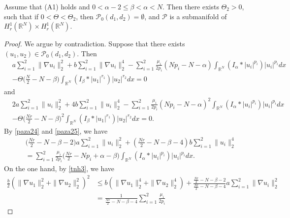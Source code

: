 \documentclass[reqno]{amsart}
\begin{document}
\begin{lemma}\label{zlx}
Assume that {\rm (A1)} holds and $0<\alpha-2\leq\beta<\alpha<N$. Then there exists 
$\Theta_2>0$, such that if $0<\Theta<\Theta_2$, then $\mathcal{P}_0(d_1,d_2)=\emptyset$, 
and $\mathcal{P}$ is a submanifold
of $H_r^1(\mathbb{R}^N)\times H_r^1(\mathbb{R}^N)$.
\end{lemma}

\begin{proof}
We argue by contradiction. Suppose that there exists
 $(u_1,u_2)\in\mathcal{P}_0(d_1,d_2)$. Then
\begin{equation}\label{paza24}
\begin{aligned}
&a\sum_{i=1}^2\| \nabla u_i\|_2^2+b\sum_{i=1}^2\| \nabla u_i\|_2^4
-\sum_{i=1}^2\frac{\mu_i}{2p_i}(Np_i-N-\alpha)
\int_{\mathbb{R}^N}(I_\alpha\ast|u_i|^{p_i})|u_i|^{p_i}dx\\
&-\Theta\Big(\frac{N}{2}-N-\beta\Big)\int_{\mathbb{R}^N}(I_\beta\ast|u_1|^{r_1})|u_2|^{r_2}dx=0
\end{aligned}
\end{equation}
and
\begin{equation}\label{paza25}
\begin{aligned}
&2a\sum_{i=1}^2\| u_i\|_2^2+4b\sum_{i=1}^2\| u_i\|_2^4
-\sum_{i=1}^2\frac{\mu_i}{2p_i}(Np_i-N-\alpha)^2
\int_{\mathbb{R}^N}(I_\alpha\ast|u_i|^{p_i})|u_i|^{p_i}dx\\
&-\Theta\Big(\frac{Nr}{2}-N-\beta\Big)^2\int_{\mathbb{R}^N}
 (I_\beta\ast|u_1|^{r_1})|u_2|^{r_2}dx=0.
\end{aligned}
\end{equation}
By \eqref{paza24} and \eqref{paza25}, we have
\begin{equation}\label{tnh3}
 \begin{aligned}
&\Big(\frac{Nr}{2}-N-\beta-2\Big)a\sum_{i=1}^2\| u_i\|_2^2
+(\frac{Nr}{2}-N-\beta-4)b\sum_{i=1}^2\| u_i\|_2^4\\
&=\sum_{i=1}^2\frac{\mu_i}{2p_i}\Big(\frac{Nr}{2}-Np_i+\alpha-\beta\Big)
\int_{\mathbb{R}^N}(I_\alpha\ast|u_i|^{p_i})|u_i|^{p_i}dx.
\end{aligned}
\end{equation}
On the one hand, by \eqref{tnh3}, we have
\begin{align*}
\frac{b}{2}(\| \nabla u_1\|_2^2+\| \nabla u_2\|_2^2)^2&\leq b(\| \nabla u_1\|_2^4
+\| \nabla u_2\|_2^4)+\frac{\frac{Nr}{2}-N-\beta-2}{\frac{Nr}{2}-N-\beta-4}
 a\sum_{i=1}^2\| \nabla u_i\|_2^2\\
&= \frac{1}{\frac{Nr}{2}-N-\beta-4}\sum_{i=1}^2\frac{\mu_i}{2p_i}

\end{align*}
\end{proof}
\end{document}
